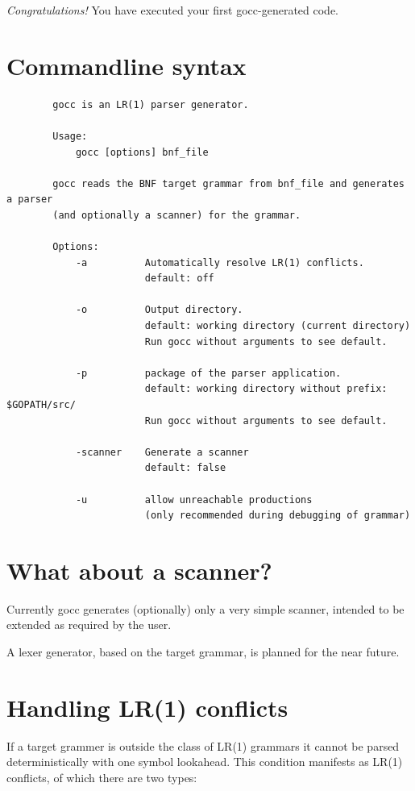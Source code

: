 \documentclass[12pt]{article}
\begin{document}
		{\em Congratulations!} You have executed your first gocc-generated code.

\section{Commandline syntax}\label{sec:commandline}
	\begin{verbatim}
		gocc is an LR(1) parser generator.

		Usage:
		    gocc [options] bnf_file

		gocc reads the BNF target grammar from bnf_file and generates a parser 
		(and optionally a scanner) for the grammar.

		Options:
		    -a          Automatically resolve LR(1) conflicts.
		                default: off

		    -o          Output directory.
		                default: working directory (current directory)
		                Run gocc without arguments to see default.

		    -p          package of the parser application.
		                default: working directory without prefix: $GOPATH/src/
		                Run gocc without arguments to see default.

		    -scanner    Generate a scanner
		                default: false

		    -u          allow unreachable productions 
		                (only recommended during debugging of grammar)
	\end{verbatim}

\section{What about a scanner?}\label{sec:scanner}
	Currently gocc generates (optionally) only a very simple scanner, intended to be extended as required by the user.

	A lexer generator, based on the target grammar, is planned for the near future.

\section{Handling LR(1) conflicts} \label{sec:lr conflicts}
	If a target grammer is outside the class of LR(1) grammars it cannot be parsed deterministically with one symbol lookahead. This condition manifests as LR(1) conflicts, of which there are two types:
\end{document}
